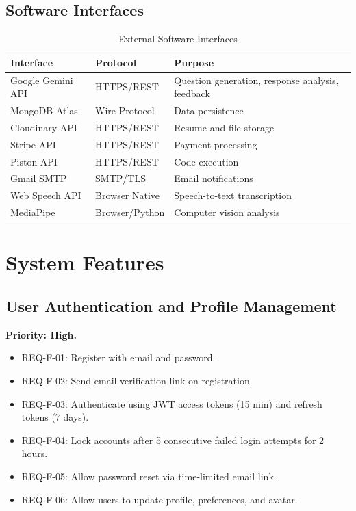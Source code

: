 \subsection*{Software Interfaces}

\begin{table}[H]
\centering
\caption{External Software Interfaces}
\vspace{6pt}
\begin{tabularx}{\textwidth}{|L{3cm}|L{2.5cm}|X|}
\hline
\textbf{Interface} & \textbf{Protocol} & \textbf{Purpose} \\
\hline
Google Gemini API & HTTPS/REST & Question generation, response analysis, feedback \\
\hline
MongoDB Atlas & Wire Protocol & Data persistence \\
\hline
Cloudinary API & HTTPS/REST & Resume and file storage \\
\hline
Stripe API & HTTPS/REST & Payment processing \\
\hline
Piston API & HTTPS/REST & Code execution \\
\hline
Gmail SMTP & SMTP/TLS & Email notifications \\
\hline
Web Speech API & Browser Native & Speech-to-text transcription \\
\hline
MediaPipe & Browser/Python & Computer vision analysis \\
\hline
\end{tabularx}
\label{tab:softwareinterfaces}
\end{table}

\section{System Features}

\subsection{User Authentication and Profile Management}
\textbf{Priority: High.}
\begin{itemize}
  \item REQ-F-01: Register with email and password.
  \item REQ-F-02: Send email verification link on registration.
  \item REQ-F-03: Authenticate using JWT access tokens (15 min) and refresh tokens (7 days).
  \item REQ-F-04: Lock accounts after 5 consecutive failed login attempts for 2 hours.
  \item REQ-F-05: Allow password reset via time-limited email link.
  \item REQ-F-06: Allow users to update profile, preferences, and avatar.
\end{itemize}

